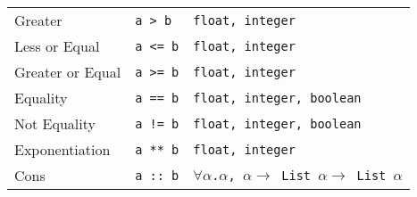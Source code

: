 \documentclass{l4proj}
\begin{document}
\begin{table}[h!]
\begin{center}
\begin{tabular}{@{}|l|l|l|@{}}
    Greater               & \texttt{a > b}        &   \texttt{float, integer} \\
    Less or Equal         & \texttt{a <= b}       &   \texttt{float, integer} \\
    Greater or Equal      & \texttt{a >= b}       &   \texttt{float, integer} \\
    Equality              & \texttt{a == b}       &   \texttt{float, integer, boolean} \\
    Not Equality          & \texttt{a != b}       &   \texttt{float, integer, boolean} \\
    Exponentiation        & \texttt{a ** b}       &   \texttt{float, integer} \\
    Cons                  & \texttt{a :: b}       &   \texttt{$\forall \alpha$.$\alpha$, $\alpha \rightarrow$ List $\alpha \rightarrow$ List $\alpha$} \\
    \hline
    \end{tabular}
    \end{center}
\end{table}
\end{document}

